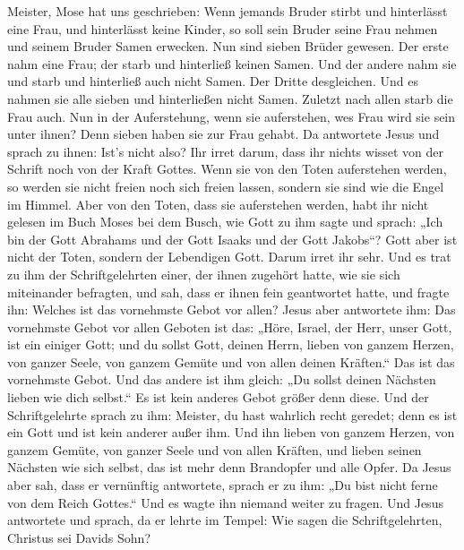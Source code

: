 Meister, Mose hat uns geschrieben: Wenn jemands Bruder stirbt und
hinterlässt eine Frau, und hinterlässt keine Kinder, so soll sein Bruder
seine Frau nehmen und seinem Bruder Samen erwecken.  Nun
sind sieben Brüder gewesen. Der erste nahm eine Frau; der starb und
hinterließ keinen Samen.  Und der andere nahm sie und
starb und hinterließ auch nicht Samen. Der Dritte desgleichen.
 Und es nahmen sie alle sieben und hinterließen nicht
Samen. Zuletzt nach allen starb die Frau auch.  Nun in
der Auferstehung, wenn sie auferstehen, wes Frau wird sie sein unter
ihnen? Denn sieben haben sie zur Frau gehabt.  Da
antwortete Jesus und sprach zu ihnen: Ist's nicht also? Ihr irret darum,
dass ihr nichts wisset von der Schrift noch von der Kraft Gottes.
 Wenn sie von den Toten auferstehen werden, so werden sie
nicht freien noch sich freien lassen, sondern sie sind wie die Engel im
Himmel.  Aber von den Toten, dass sie auferstehen werden,
habt ihr nicht gelesen im Buch Moses bei dem Busch, wie Gott zu ihm
sagte und sprach: „Ich bin der Gott Abrahams und der Gott Isaaks und der
Gott Jakobs``?  Gott aber ist nicht der Toten, sondern
der Lebendigen Gott. Darum irret ihr sehr.  Und es trat
zu ihm der Schriftgelehrten einer, der ihnen zugehört hatte, wie sie
sich miteinander befragten, und sah, dass er ihnen fein geantwortet
hatte, und fragte ihn: Welches ist das vornehmste Gebot vor allen?
 Jesus aber antwortete ihm: Das vornehmste Gebot vor
allen Geboten ist das: „Höre, Israel, der Herr, unser Gott, ist ein
einiger Gott;  und du sollst Gott, deinen Herrn, lieben
von ganzem Herzen, von ganzer Seele, von ganzem Gemüte und von allen
deinen Kräften.`` Das ist das vornehmste Gebot.  Und das
andere ist ihm gleich: „Du sollst deinen Nächsten lieben wie dich
selbst.`` Es ist kein anderes Gebot größer denn diese. 
Und der Schriftgelehrte sprach zu ihm: Meister, du hast wahrlich recht
geredet; denn es ist ein Gott und ist kein anderer außer ihm.
 Und ihn lieben von ganzem Herzen, von ganzem Gemüte, von
ganzer Seele und von allen Kräften, und lieben seinen Nächsten wie sich
selbst, das ist mehr denn Brandopfer und alle Opfer.  Da
Jesus aber sah, dass er vernünftig antwortete, sprach er zu ihm: „Du
bist nicht ferne von dem Reich Gottes.`` Und es wagte ihn niemand weiter
zu fragen.  Und Jesus antwortete und sprach, da er lehrte
im Tempel: Wie sagen die Schriftgelehrten, Christus sei Davids Sohn?
